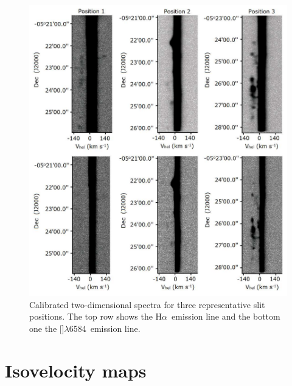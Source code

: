 \documentclass[a4paper,fleqn,usenatbib]{mnras}     %
\newcommand{\Ha} {H$\alpha$}      		%
\newcommand{\NII} {[\ion{N}{ii}]}            %
\begin{document}
\begin{figure}
    \includegraphics[width=\columnwidth]{Figs/calibrated_spectra.pdf}
    \caption{Calibrated two-dimensional spectra for three representative slit positions. The top row shows the \Ha~emission line and 
      the bottom one the \NII$\lambda$6584~emission line.}
    \label{fig:calibrated_spectra}
\end{figure}











   
\section{Isovelocity maps}\label{sec:maps}
\end{document}

